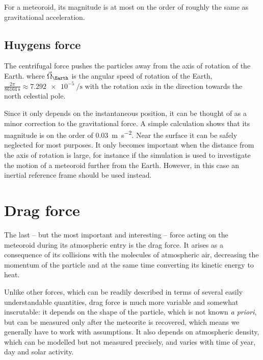         For a meteoroid, its magnitude is at most on the order of
        roughly the same as gravitational acceleration.



    \subsection{Huygens force} \label{dfH}
        The centrifugal force pushes the particles away from the axis of rotation of the Earth.
        where $\vec{\Omega}_\Earth$ is the angular speed of rotation of the Earth,
        $\frac{2\pi}{\SI{86164}{\second}} \approx \SI{7.292e-5}{\per\second}$
        with the rotation axis in the direction towards the north celestial pole.

        Since it only depends on the instantaneous position, it can be thought of as a minor correction to the
        gravitational force. A simple calculation shows that its magnitude is on the order
        of \SI{0.03}{\metre\per\second\squared}. Near the surface it can be safely neglected for most purposes.
        It only becomes important when the distance from the axis of rotation is large, for instance if the simulation
        is used to investigate the motion of a meteoroid further from the Earth.
        However, in this case an inertial reference frame should be used instead.

\section{Drag force} \label{fd}
        The last -- but the most important and interesting -- force acting on the meteoroid during
        its atmospheric entry is the drag force. It arises as a consequence of its collisions with
        the molecules of atmospheric air, decreasing the momentum of the particle and at the
        same time converting its kinetic energy to heat.

        Unlike other forces, which can be readily described in terms of several easily understandable
        quantities, drag force is much more variable and somewhat inscrutable: it depends on the shape
        of the particle, which is not known \textit{a priori}, but can be measured only after
        the meteorite is recovered, which means we generally have to work with assumptions.
        It also depends on atmospheric density, which can be modelled but not measured precisely,
        and varies with time of year, day and solar activity.

